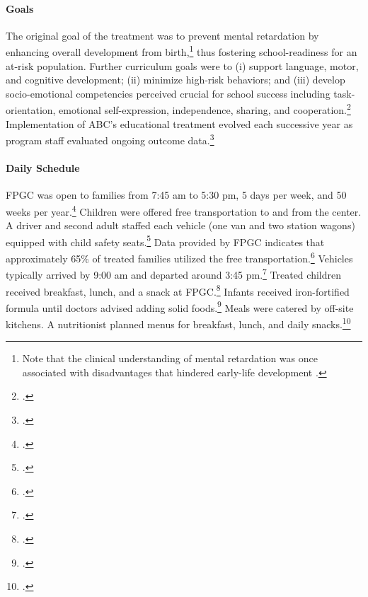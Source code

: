 \paragraph{Goals}
\noindent The original goal of the treatment was to prevent mental retardation by enhancing overall development from birth,\footnote{Note that the clinical understanding of mental retardation was once associated with disadvantages that hindered early-life development \citep{Mental-Retardation_America_2004_BOOK_NYU}.} thus fostering school-readiness for an at-risk population. Further curriculum goals were to (i) support language, motor, and cognitive development; (ii) minimize high-risk behaviors; and (iii) develop socio-emotional competencies perceived crucial for school success including task-orientation, emotional self-expression, independence, sharing, and cooperation.\footnote{\citet{Sparling_1974_Synth_Edu_Infant_SPEECH,Ramey_Collier_etal_1976_CarolinaAbecedarianProject,Ramey-etal_2012-ABC}.} Implementation of ABC's educational treatment evolved each successive year as program staff evaluated ongoing outcome data.\footnote{ \citet{McGinness_1982_Language-Poverty-Child,Haskins_1985_CD,Finkelstein_1982_Day_Care_YC,Ramey-etal_1975_AJoMD}.}\\


\paragraph{Daily Schedule}
\noindent FPGC was open to families from 7:45 am to 5:30 pm, 5 days per week, and 50 weeks per year.\footnote{\citet{Ramey_Collier_etal_1976_CarolinaAbecedarianProject}.} Children were offered free transportation to and from the center. A driver and second adult staffed each vehicle (one van and two station wagons) equipped with child safety seats.\footnote{\citet{Ramey_Campbell_1979_SR,abc2014-2015interviews}.} Data provided by FPGC indicates that approximately 65\% of treated families utilized the free transportation.\footnote{\citet{Barnett_Masse_2002_benefitcost}.} Vehicles typically arrived by 9:00 am and departed around 3:45 pm.\footnote{\citet{Ramey-et-al_1977_Intro-to-ABC}.} Treated children received breakfast, lunch, and a snack at FPGC.\footnote{ \citet{Haskins_1985_CD}.} Infants received iron-fortified formula until doctors advised adding solid foods.\footnote{\citet{Campbell_Conti_etal_2014_EarlyChildhoodInvestments,abc2014-2015interviews}.} Meals were catered by off-site kitchens. A nutritionist planned menus for breakfast, lunch, and daily snacks.\footnote{\citet{Ramey-et-al_1977_Intro-to-ABC}.}\\

